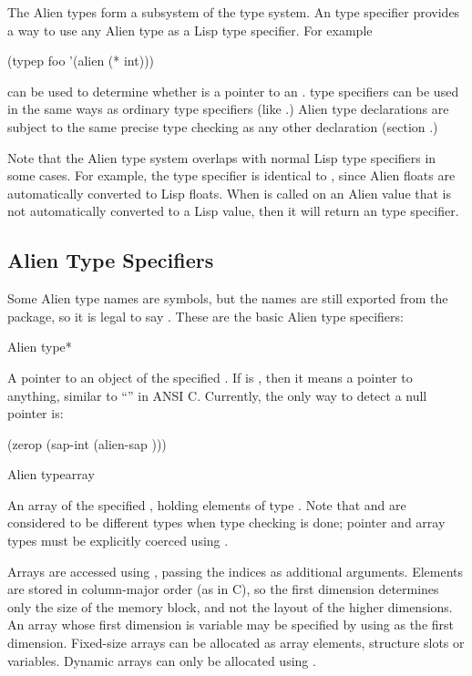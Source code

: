 The Alien types form a subsystem of the \cmucl{} type system.  An
 type specifier provides a way to use any Alien type as a
Lisp type specifier.  For example

\begin{lisp}
(typep foo '(alien (* int)))
\end{lisp}

can be used to determine whether  is a pointer to an
.   type specifiers can be used in the same ways
as ordinary type specifiers (like .)  Alien type
declarations are subject to the same precise type checking as any
other declaration (section .)

Note that the Alien type system overlaps with normal Lisp type
specifiers in some cases.  For example, the type specifier
 is identical to , since
Alien floats are automatically converted to Lisp floats.  When
 is called on an Alien value that is not automatically
converted to a Lisp value, then it will return an  type
specifier.


\subsection{Alien Type Specifiers}

Some Alien type names are \clisp{} symbols, but the names are
still exported from the  package, so it is legal to say
.  These are the basic Alien type specifiers: 

\begin{deftp}{Alien type}{*}{%
    }
  
  A pointer to an object of the specified .  If 
  is \true, then it means a pointer to anything, similar to
  ``'' in ANSI C.  Currently, the only way to detect a
  null pointer is:
\begin{lisp}
  (zerop (sap-int (alien-sap )))
\end{lisp}
\end{deftp}

\begin{deftp}{Alien type}{array}{ } 

  An array of the specified , holding elements of type
  .  Note that  and  are
  considered to be different types when type checking is done; pointer
  and array types must be explicitly coerced using .
  
  Arrays are accessed using , passing the indices as
  additional arguments.  Elements are stored in column-major order (as
  in C), so the first dimension determines only the size of the memory
  block, and not the layout of the higher dimensions.  An array whose
  first dimension is variable may be specified by using \nil{} as the
  first dimension.  Fixed-size arrays can be allocated as array
  elements, structure slots or  variables.  Dynamic
  arrays can only be allocated using .
\end{deftp}


